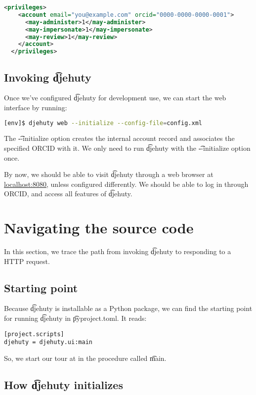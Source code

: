 \begin{lstlisting}[language=xml]
  <privileges>
    <account email="you@example.com" orcid="0000-0000-0000-0001">
      <may-administer>1</may-administer>
      <may-impersonate>1</may-impersonate>
      <may-review>1</may-review>
    </account>
  </privileges>
\end{lstlisting}

\subsection{Invoking \t{djehuty}}

Once we've configured \t{djehuty} for development use, we can start the web
interface by running:

\begin{lstlisting}[language=bash]
[env]$ djehuty web --initialize --config-file=config.xml
\end{lstlisting}

The \t{-{}-initialize} option creates the internal account record and
associates the specified ORCID with it.  We only need to run \t{djehuty}
with the \t{-{}-initialize} option once.

By now, we should be able to visit \t{djehuty} through a web browser at
\href{http://127.0.0.1:8080}{localhost:8080}, unless configured differently.
We should be able to log in through ORCID, and access all features of
\t{djehuty}.

\section{Navigating the source code}

In this section, we trace the path from invoking \t{djehuty} to responding
to a HTTP request.

\subsection{Starting point}
Because \t{djehuty} is installable as a Python package, we can find the
starting point for running \t{djehuty} in \t{pyproject.toml}.  It reads:
\begin{lstlisting}
[project.scripts]
djehuty = djehuty.ui:main
\end{lstlisting}

So, we start our tour at  in the procedure called \t{main}.

\subsection{How \t{djehuty} initializes}

